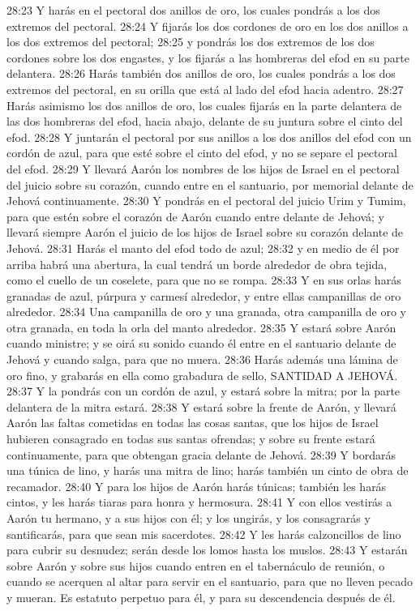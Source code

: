 28:23 Y harás en el pectoral dos anillos de oro, los cuales pondrás a los dos extremos del pectoral. 
28:24 Y fijarás los dos cordones de oro en los dos anillos a los dos extremos del pectoral; 
28:25 y pondrás los dos extremos de los dos cordones sobre los dos engastes, y los fijarás a las hombreras del efod en su parte delantera. 
28:26 Harás también dos anillos de oro, los cuales pondrás a los dos extremos del pectoral, en su orilla que está al lado del efod hacia adentro. 
28:27 Harás asimismo los dos anillos de oro, los cuales fijarás en la parte delantera de las dos hombreras del efod, hacia abajo, delante de su juntura sobre el cinto del efod. 
28:28 Y juntarán el pectoral por sus anillos a los dos anillos del efod con un cordón de azul, para que esté sobre el cinto del efod, y no se separe el pectoral del efod. 
28:29 Y llevará Aarón los nombres de los hijos de Israel en el pectoral del juicio sobre su corazón, cuando entre en el santuario, por memorial delante de Jehová continuamente. 
28:30 Y pondrás en el pectoral del juicio Urim y Tumim,  para que estén sobre el corazón de Aarón cuando entre delante de Jehová; y llevará siempre Aarón el juicio de los hijos de Israel sobre su corazón delante de Jehová. 
28:31 Harás el manto del efod todo de azul; 
28:32 y en medio de él por arriba habrá una abertura, la cual tendrá un borde alrededor de obra tejida, como el cuello de un coselete, para que no se rompa. 
28:33 Y en sus orlas harás granadas de azul, púrpura y carmesí alrededor, y entre ellas campanillas de oro alrededor. 
28:34 Una campanilla de oro y una granada, otra campanilla de oro y otra granada, en toda la orla del manto alrededor. 
28:35 Y estará sobre Aarón cuando ministre; y se oirá su sonido cuando él entre en el santuario delante de Jehová y cuando salga, para que no muera. 
28:36 Harás además una lámina de oro fino, y grabarás en ella como grabadura de sello, SANTIDAD A JEHOVÁ. 
28:37 Y la pondrás con un cordón de azul, y estará sobre la mitra; por la parte delantera de la mitra estará. 
28:38 Y estará sobre la frente de Aarón, y llevará Aarón las faltas cometidas en todas las cosas santas, que los hijos de Israel hubieren consagrado en todas sus santas ofrendas; y sobre su frente estará continuamente, para que obtengan gracia delante de Jehová. 
28:39 Y bordarás una túnica de lino, y harás una mitra de lino; harás también un cinto de obra de recamador. 
28:40 Y para los hijos de Aarón harás túnicas; también les harás cintos, y les harás tiaras para honra y hermosura. 
28:41 Y con ellos vestirás a Aarón tu hermano, y a sus hijos con él; y los ungirás, y los consagrarás y santificarás, para que sean mis sacerdotes. 
28:42 Y les harás calzoncillos de lino para cubrir su desnudez; serán desde los lomos hasta los muslos. 
28:43 Y estarán sobre Aarón y sobre sus hijos cuando entren en el tabernáculo de reunión, o cuando se acerquen al altar para servir en el santuario, para que no lleven pecado y mueran. Es estatuto perpetuo para él, y para su descendencia después de él. 
